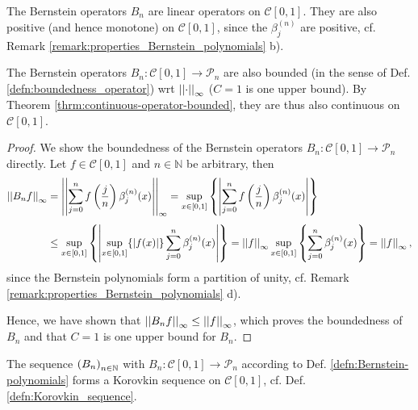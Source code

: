 \begin{remark}
	The Bernstein operators $B_n$ are linear operators on $\mathcal C[0, 1]$. They are also positive (and hence monotone) on $\mathcal C[0, 1]$, since the $\beta_{j}^{(n)}$ are positive, cf. Remark \ref{remark:properties_Bernstein_polynomials} b).
\end{remark}

\begin{remark}
	The Bernstein operators $B_n: \mathcal C[0, 1]\to\mathcal P_n$ are also bounded (in the sense of Def. \ref{defn:boundedness_operator}) wrt $\norm{\cdot}{\infty}$ ($C=1$ is one upper bound). By Theorem \ref{thrm:continuous-operator-bounded}, they are thus also continuous on $\mathcal C [0, 1]$.
\end{remark}

\begin{proof}
	We show the boundedness of the Bernstein operators $B_n: \mathcal C[0, 1]\to \mathcal P_n$ directly. Let $f\in\mathcal C[0, 1]$ and $n\in\mathbb N$ be arbitrary, then
	\begin{align}
		\norm{B_nf}{\infty} &= \norm{\sum_{j=0}^{n}f\left(\frac{j}{n}\right)\beta_j^{(n)}(x)}{\infty} = \sup_{x\in[0, 1]}\left\{\abs{\sum_{j=0}^{n}f\left(\frac{j}{n}\right)\beta_{j}^{(n)}(x)}\right\}
		\\[4pt] &\leq \sup_{x\in[0, 1]}\left\{\abs{\sup_{x\in[0, 1]}\{\abs{f(x)}\}\sum_{j=0}^{n}\beta_{j}^{(n)}(x)}\right\} = \norm{f}{\infty}\sup_{x\in[0, 1]}\left\{\sum_{j=0}^{n}\beta_{j}^{(n)}(x)\right\} = \norm{f}{\infty},
	\end{align}
	since the Bernstein polynomials form a partition of unity, cf. Remark \ref{remark:properties_Bernstein_polynomials} d). 
	
	Hence, we have shown that $\norm{B_nf}{\infty} \leq \norm{f}{\infty}$, which proves the boundedness of $B_n$ and that $C = 1$ is one upper bound for $B_n$.
\end{proof}

\begin{theorem}
	The sequence $\seq[B_n]$ with $B_n: \mathcal C[0, 1]\to \mathcal P_n$ according to Def. \ref{defn:Bernstein-polynomials} forms a Korovkin sequence on $\mathcal C[0, 1]$, cf. Def. \ref{defn:Korovkin_sequence}.
\end{theorem}

